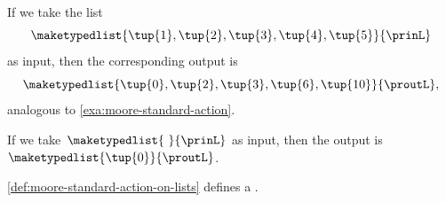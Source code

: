 {\begin{example}
    If we take the list
    \begin{equation}
        \maketypedlist{\tup{1}, \tup{2}, \tup{3}, \tup{4}, \tup{5}}{\prinL}
    \end{equation}
    as input, then the corresponding output is
    \begin{equation}
        \maketypedlist{\tup{0}, \tup{2}, \tup{3}, \tup{6}, \tup{10}}{\proutL},
    \end{equation}
    analogous to \cref{exa:moore-standard-action}.

    If we take~$\maketypedlist{\ }{\prinL}$ as input, then the output is~$\maketypedlist{\tup{0}}{\proutL}$.
\end{example}


\begin{lemma}\label{lem:moore-standard-action-on-lists}
    \cref{def:moore-standard-action-on-lists} defines a .
\end{lemma}


}